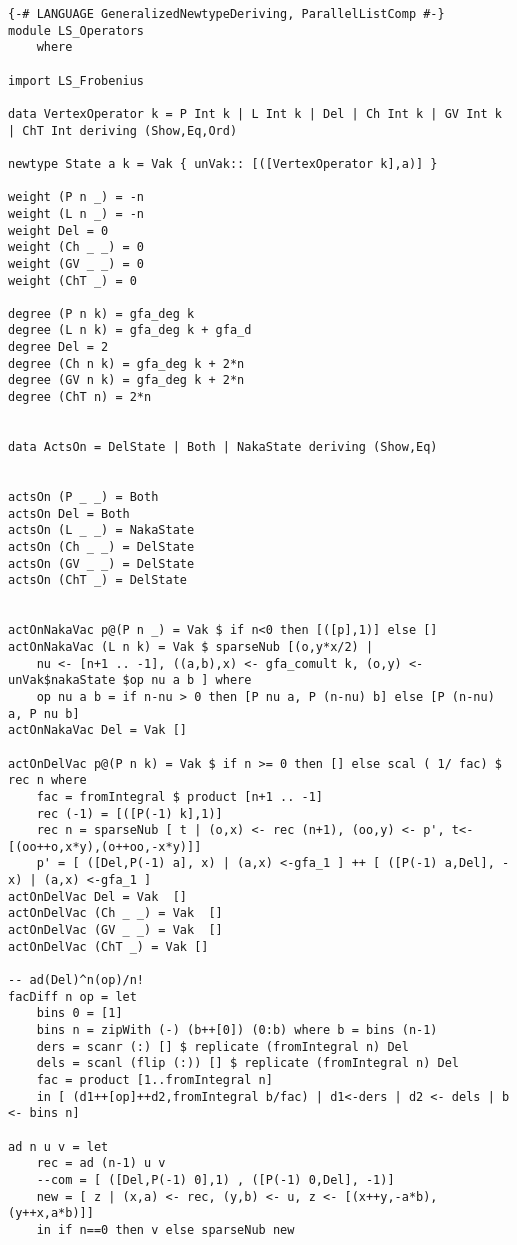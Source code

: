 \begin{lstlisting}
{-# LANGUAGE GeneralizedNewtypeDeriving, ParallelListComp #-}
module LS_Operators
	where

import LS_Frobenius

data VertexOperator k = P Int k | L Int k | Del | Ch Int k | GV Int k | ChT Int deriving (Show,Eq,Ord)

newtype State a k = Vak { unVak:: [([VertexOperator k],a)] }

weight (P n _) = -n
weight (L n _) = -n
weight Del = 0
weight (Ch _ _) = 0
weight (GV _ _) = 0
weight (ChT _) = 0

degree (P n k) = gfa_deg k
degree (L n k) = gfa_deg k + gfa_d
degree Del = 2
degree (Ch n k) = gfa_deg k + 2*n
degree (GV n k) = gfa_deg k + 2*n
degree (ChT n) = 2*n


data ActsOn = DelState | Both | NakaState deriving (Show,Eq)


actsOn (P _ _) = Both
actsOn Del = Both
actsOn (L _ _) = NakaState
actsOn (Ch _ _) = DelState
actsOn (GV _ _) = DelState
actsOn (ChT _) = DelState


actOnNakaVac p@(P n _) = Vak $ if n<0 then [([p],1)] else []
actOnNakaVac (L n k) = Vak $ sparseNub [(o,y*x/2) | 
	nu <- [n+1 .. -1], ((a,b),x) <- gfa_comult k, (o,y) <-unVak$nakaState $op nu a b ] where
	op nu a b = if n-nu > 0 then [P nu a, P (n-nu) b] else [P (n-nu) a, P nu b]
actOnNakaVac Del = Vak []

actOnDelVac p@(P n k) = Vak $ if n >= 0 then [] else scal ( 1/ fac) $ rec n where
	fac = fromIntegral $ product [n+1 .. -1] 
	rec (-1) = [([P(-1) k],1)]
	rec n = sparseNub [ t | (o,x) <- rec (n+1), (oo,y) <- p', t<-[(oo++o,x*y),(o++oo,-x*y)]]   
	p' = [ ([Del,P(-1) a], x) | (a,x) <-gfa_1 ] ++ [ ([P(-1) a,Del], -x) | (a,x) <-gfa_1 ] 
actOnDelVac Del = Vak  []
actOnDelVac (Ch _ _) = Vak  []
actOnDelVac (GV _ _) = Vak  []
actOnDelVac (ChT _) = Vak []

-- ad(Del)^n(op)/n!
facDiff n op = let 
	bins 0 = [1]
	bins n = zipWith (-) (b++[0]) (0:b) where b = bins (n-1)
	ders = scanr (:) [] $ replicate (fromIntegral n) Del
	dels = scanl (flip (:)) [] $ replicate (fromIntegral n) Del
	fac = product [1..fromIntegral n] 
	in [ (d1++[op]++d2,fromIntegral b/fac) | d1<-ders | d2 <- dels | b <- bins n]

ad n u v = let
	rec = ad (n-1) u v
	--com = [ ([Del,P(-1) 0],1) , ([P(-1) 0,Del], -1)]
	new = [ z | (x,a) <- rec, (y,b) <- u, z <- [(x++y,-a*b),(y++x,a*b)]]
	in if n==0 then v else sparseNub new


\end{lstlisting}

